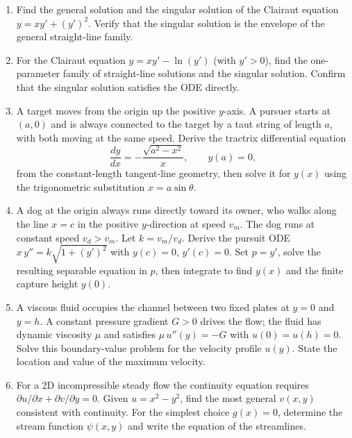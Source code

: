 \begin{enumerate}[leftmargin=2em, itemsep=8pt]

    \item Find the general solution and the singular solution of the Clairaut
          equation $y = xy' + (y')^2$. Verify that the singular solution is
          the envelope of the general straight-line family.

    \item For the Clairaut equation $y = xy' - \ln(y')$ (with $y' > 0$),
          find the one-parameter family of straight-line solutions and the
          singular solution. Confirm that the singular solution satisfies the
          ODE directly.

    \item A target moves from the origin up the positive $y$-axis. A pursuer
          starts at $(a,0)$ and is always connected to the target by a taut
          string of length $a$, with both moving at the same speed. Derive
          the tractrix differential equation
          \[
            \frac{dy}{dx} = -\frac{\sqrt{a^2 - x^2}}{x},
            \qquad y(a) = 0,
          \]
          from the constant-length tangent-line geometry, then solve it for
          $y(x)$ using the trigonometric substitution $x = a\sin\theta$.

    \item A dog at the origin always runs directly toward its owner, who walks
          along the line $x = c$ in the positive $y$-direction at speed $v_m$.
          The dog runs at constant speed $v_d > v_m$. Let $k = v_m/v_d$.
          Derive the pursuit ODE $x\,y'' = k\sqrt{1 + (y')^2}$ with
          $y(c) = 0$, $y'(c) = 0$. Set $p = y'$, solve the resulting
          separable equation in $p$, then integrate to find $y(x)$ and the
          finite capture height $y(0)$.

    \item A viscous fluid occupies the channel between two fixed plates at
          $y = 0$ and $y = h$. A constant pressure gradient $G > 0$ drives
          the flow; the fluid has dynamic viscosity $\mu$ and satisfies
          $\mu\,u''(y) = -G$ with $u(0) = u(h) = 0$. Solve this boundary-value
          problem for the velocity profile $u(y)$. State the location and
          value of the maximum velocity.

    \item For a 2D incompressible steady flow the continuity equation requires
          $\partial u/\partial x + \partial v/\partial y = 0$. Given
          $u = x^2 - y^2$, find the most general $v(x,y)$ consistent with
          continuity. For the simplest choice $g(x) = 0$, determine the stream
          function $\psi(x,y)$ and write the equation of the streamlines.


\end{enumerate}
